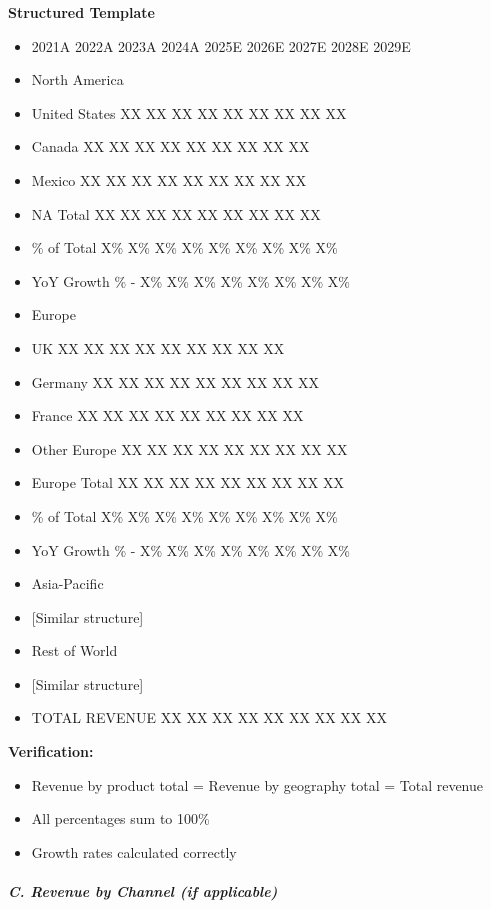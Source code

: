 \documentclass[11pt]{article}
\begin{document}
\textbf{Structured Template}
\begin{itemize}[leftmargin=*,itemsep=2pt,topsep=2pt]
\item {} 2021A 2022A 2023A 2024A 2025E 2026E 2027E 2028E 2029E
\item {} North America
\item {} United States XX XX XX XX XX XX XX XX XX
\item {} Canada XX XX XX XX XX XX XX XX XX
\item {} Mexico XX XX XX XX XX XX XX XX XX
\item {} NA Total XX XX XX XX XX XX XX XX XX
\item {} \% of Total X\% X\% X\% X\% X\% X\% X\% X\% X\%
\item {} YoY Growth \% - X\% X\% X\% X\% X\% X\% X\% X\%
\item {} Europe
\item {} UK XX XX XX XX XX XX XX XX XX
\item {} Germany XX XX XX XX XX XX XX XX XX
\item {} France XX XX XX XX XX XX XX XX XX
\item {} Other Europe XX XX XX XX XX XX XX XX XX
\item {} Europe Total XX XX XX XX XX XX XX XX XX
\item {} \% of Total X\% X\% X\% X\% X\% X\% X\% X\% X\%
\item {} YoY Growth \% - X\% X\% X\% X\% X\% X\% X\% X\%
\item {} Asia-Pacific
\item {} [Similar structure]
\item {} Rest of World
\item {} [Similar structure]
\item {} TOTAL REVENUE XX XX XX XX XX XX XX XX XX
\end{itemize}

\textbf{Verification:}

\begin{itemize}[leftmargin=*,itemsep=2pt,topsep=2pt]
\item {} Revenue by product total = Revenue by geography total = Total revenue
\item {} All percentages sum to 100\%
\item {} Growth rates calculated correctly
\end{itemize}

\subparagraph{C. Revenue by Channel (if applicable)}\mbox{}\par
\end{document}
